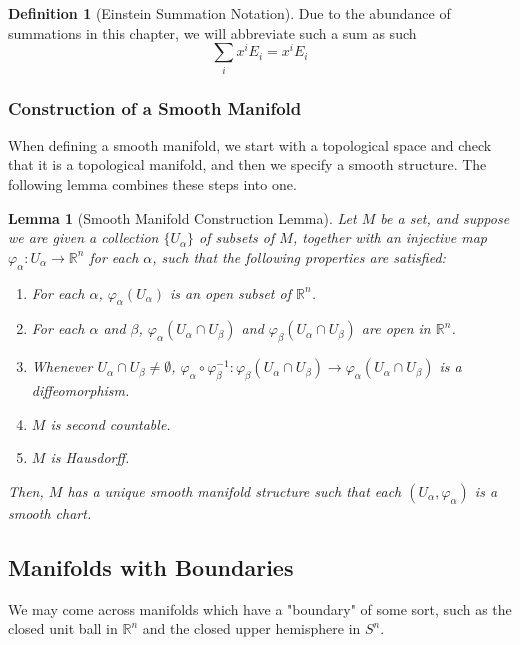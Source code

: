 \documentclass{article}
\newtheorem{lemma}[theorem]{Lemma}
\theoremstyle{remark}
\theoremstyle{definition}
\newtheorem{definition}{Definition}[section]
\begin{document}
\begin{definition}[Einstein Summation Notation]
Due to the abundance of summations in this chapter, we will abbreviate such a sum as such 
\[\sum_i x^i E_i = x^i E_i\]
\end{definition}


\subsubsection{Construction of a Smooth Manifold}
When defining a smooth manifold, we start with a topological space and check that it is a topological manifold, and then we specify a smooth structure. The following lemma combines these steps into one. 

\begin{lemma}[Smooth Manifold Construction Lemma]
Let $M$ be a set, and suppose we are given a collection $\{U_\alpha\}$ of subsets of $M$, together with an injective map $\varphi_\alpha: U_\alpha \longrightarrow \mathbb{R}^n$ for each $\alpha$, such that the following properties are satisfied:
\begin{enumerate}
    \item For each $\alpha$, $\varphi_\alpha (U_\alpha)$ is an open subset of $\mathbb{R}^n$.
    \item For each $\alpha$ and $\beta$, $\varphi_\alpha (U_\alpha \cap U_\beta)$ and $\varphi_\beta (U_\alpha \cap U_\beta)$ are open in $\mathbb{R}^n$. 
    \item Whenever $U_\alpha \cap U_\beta \neq \emptyset$, $\varphi_\alpha \circ \varphi_\beta^{-1}: \varphi_\beta (U_\alpha \cap U_\beta) \longrightarrow \varphi_\alpha (U_\alpha \cap U_\beta)$ is a diffeomorphism. 
    \item $M$ is second countable. 
    \item $M$ is Hausdorff. 
\end{enumerate}
Then, $M$ has a unique smooth manifold structure such that each $(U_\alpha, \varphi_\alpha)$ is a smooth chart. 
\end{lemma}

\subsection{Manifolds with Boundaries}
We may come across manifolds which have a "boundary" of some sort, such as the closed unit ball in $\mathbb{R}^n$ and the closed upper hemisphere in $S^n$. 
\end{document}

